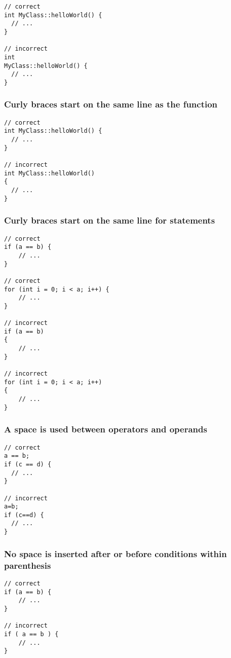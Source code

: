\begin{verbatim}
// correct
int MyClass::helloWorld() {
  // ...
}

// incorrect
int
MyClass::helloWorld() {
  // ...
}
\end{verbatim}

\subsubsection{Curly braces start on the same line as the function}

\begin{verbatim}
// correct
int MyClass::helloWorld() {
  // ...
}

// incorrect
int MyClass::helloWorld()
{
  // ...
}
\end{verbatim}

\subsubsection{Curly braces start on the same line for statements}

\begin{verbatim}
// correct
if (a == b) {
    // ...
}

// correct
for (int i = 0; i < a; i++) {
    // ...
}

// incorrect
if (a == b)
{
    // ...
}

// incorrect
for (int i = 0; i < a; i++)
{
    // ...
}
\end{verbatim}

\subsubsection{A space is used between operators and operands}

\begin{verbatim}
// correct
a == b;
if (c == d) {
  // ...
}

// incorrect
a=b;
if (c==d) {
  // ...
}
\end{verbatim}

\subsubsection{No space is inserted after or before conditions within parenthesis}

\begin{verbatim}
// correct
if (a == b) {
    // ...
}

// incorrect
if ( a == b ) {
    // ...
}
\end{verbatim}

